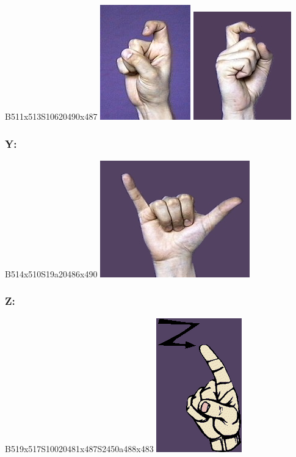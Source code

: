 \documentclass{article}
\begin{document}
B511x513S10620490x487
\includegraphics[scale=0.5]{images/x1.jpg}
\includegraphics[scale=0.5]{images/x2.jpg}

\subsubsection{Y:}

B514x510S19a20486x490
\includegraphics[scale=0.5]{images/y.jpg}

\subsubsection{Z:}

B519x517S10020481x487S2450a488x483
\includegraphics[scale=0.5]{images/z.png}
\end{document}

